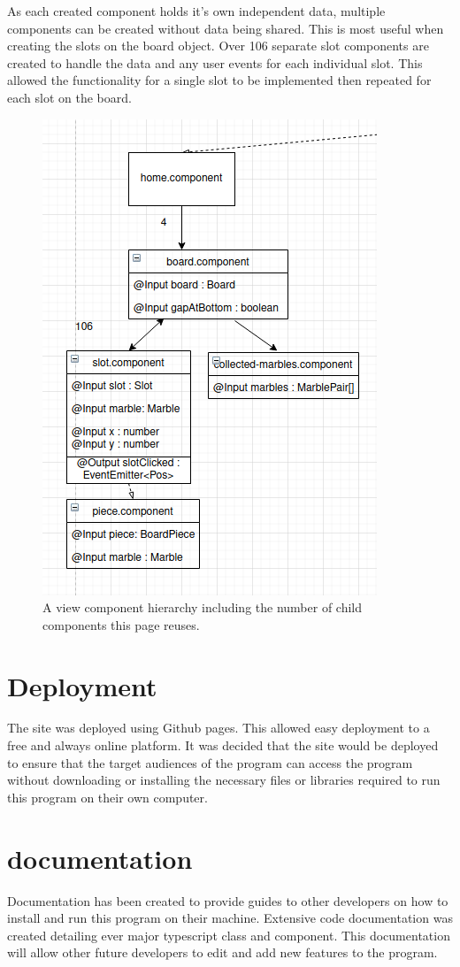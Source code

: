\documentclass{l4proj}
\begin{document}
As each created component holds it's own independent data, multiple components can be created without data being shared. This is most useful when creating the slots on the board object. Over 106 separate slot components are created to handle the data and any user events for each individual slot. This allowed the functionality for a single slot to be implemented then repeated for each slot on the board.

\begin{figure}
    \centering
    \includegraphics[width=0.7\linewidth]{images/homeComponent.png}
    \caption{A view component hierarchy including the number of child components this page reuses.}
    \label{fig:homeComponent}
\end{figure}

\section{Deployment}
The site was deployed using Github pages. This allowed easy deployment to a free and always online platform. It was decided that the site would be deployed to ensure that the target audiences of the program can access the program without downloading or installing the necessary files or libraries required to run this program on their own computer. 

\section{documentation}
Documentation has been created to provide guides to other developers on how to install and run this program on their machine. Extensive code documentation was created detailing ever major typescript class and component. This documentation will allow other future developers to edit and add new features to the program.
\end{document}
